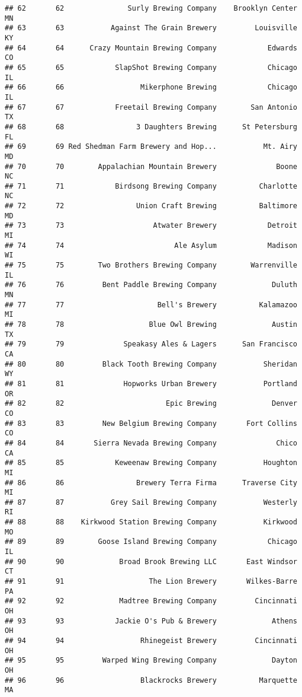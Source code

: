 \documentclass[
]{article}
\begin{document}
\begin{verbatim}
## 62       62               Surly Brewing Company    Brooklyn Center    MN
## 63       63           Against The Grain Brewery         Louisville    KY
## 64       64      Crazy Mountain Brewing Company            Edwards    CO
## 65       65            SlapShot Brewing Company            Chicago    IL
## 66       66                  Mikerphone Brewing            Chicago    IL
## 67       67            Freetail Brewing Company        San Antonio    TX
## 68       68                 3 Daughters Brewing      St Petersburg    FL
## 69       69 Red Shedman Farm Brewery and Hop...           Mt. Airy    MD
## 70       70        Appalachian Mountain Brewery              Boone    NC
## 71       71            Birdsong Brewing Company          Charlotte    NC
## 72       72                 Union Craft Brewing          Baltimore    MD
## 73       73                     Atwater Brewery            Detroit    MI
## 74       74                          Ale Asylum            Madison    WI
## 75       75        Two Brothers Brewing Company        Warrenville    IL
## 76       76         Bent Paddle Brewing Company             Duluth    MN
## 77       77                      Bell's Brewery          Kalamazoo    MI
## 78       78                    Blue Owl Brewing             Austin    TX
## 79       79              Speakasy Ales & Lagers      San Francisco    CA
## 80       80         Black Tooth Brewing Company           Sheridan    WY
## 81       81              Hopworks Urban Brewery           Portland    OR
## 82       82                        Epic Brewing             Denver    CO
## 83       83         New Belgium Brewing Company       Fort Collins    CO
## 84       84       Sierra Nevada Brewing Company              Chico    CA
## 85       85            Keweenaw Brewing Company           Houghton    MI
## 86       86                 Brewery Terra Firma      Traverse City    MI
## 87       87           Grey Sail Brewing Company           Westerly    RI
## 88       88    Kirkwood Station Brewing Company           Kirkwood    MO
## 89       89        Goose Island Brewing Company            Chicago    IL
## 90       90             Broad Brook Brewing LLC       East Windsor    CT
## 91       91                    The Lion Brewery       Wilkes-Barre    PA
## 92       92             Madtree Brewing Company         Cincinnati    OH
## 93       93            Jackie O's Pub & Brewery             Athens    OH
## 94       94                  Rhinegeist Brewery         Cincinnati    OH
## 95       95         Warped Wing Brewing Company             Dayton    OH
## 96       96                  Blackrocks Brewery          Marquette    MA

\end{verbatim}
\end{document}

